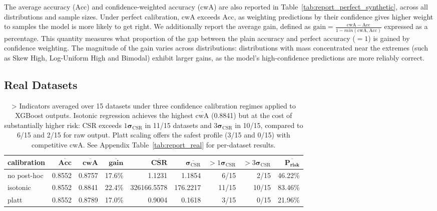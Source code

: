 \documentclass{article}
\theoremstyle{plain}
\theoremstyle{definition}
\theoremstyle{remark}
\begin{document}
The average accuracy ($\mathrm{Acc}$) and confidence-weighted accuracy ($\mathrm{cwA}$) are also reported in Table~\ref{tab:report_perfect_synthetic}, across all distributions and sample sizes. Under perfect calibration, $\mathrm{cwA}$ exceeds $\mathrm{Acc}$, as weighting predictions by their confidence gives higher weight to samples the model is more likely to get right. We additionally report the average gain, defined as $
\mathrm{gain} = \frac{\mathrm{cwA} - \mathrm{Acc}}{1 - min(\mathrm{cwA},  \mathrm{Acc})}$ expressed as a percentage. This quantity measures what proportion of the gap between the plain accuracy and perfect accuracy ($=1$) is gained by confidence weighting. The magnitude of the gain varies across distributions: distributions with mass concentrated near the extremes (such as Skew High, Log-Uniform High and Bimodal) exhibit larger gains, as the model's high-confidence predictions are more reliably correct. 

\subsection{Real Datasets}


\begin{table}[ht]
\centering
\footnotesize

\begin{tabular}{lrrrrrrrr}
\toprule
calibration & $\overline{\textbf{Acc}}$ & $\overline{\textbf{cwA}}$ & $\overline{\textbf{gain}}$ & $\overline{\textbf{CSR}}$ & $\overline{\boldsymbol{\sigma}_{\mathrm{CSR}}}$ & $>1\boldsymbol{\sigma}_{\mathrm{CSR}}$ & $>3\boldsymbol{\sigma}_{\mathrm{CSR}}$ & $\overline{\textbf{P}_{\textbf{risk}}}$ \\
\midrule
no post-hoc & 0.8552 & 0.8757 & 17.6\% & 1.1231 & 1.1854 & 6/15 & 2/15 & 46.22\% \\
isotonic & 0.8552 & 0.8841 & 22.4\% & 326166.5578 & 176.2217 & 11/15 & 10/15 & 83.46\% \\
platt & 0.8552 & 0.8789 & 17.0\% & 0.9004 & 0.1618 & 3/15 & 0/15 & 21.96\% \\
\bottomrule
\end{tabular}
\caption{> Indicators averaged over 15 datasets under three confidence calibration regimes applied to XGBoost outputs. Isotonic regression achieves the highest $\overline{\text{cwA}}$ (0.8841) but at the cost of substantially higher risk: CSR exceeds $1\boldsymbol{\sigma}_{\mathrm{CSR}}$ in 11/15 datasets and $3\boldsymbol{\sigma}_{\mathrm{CSR}}$ in 10/15, compared to 6/15 and 2/15 for raw output. Platt scaling offers the safest profile (3/15 and 0/15) with competitive cwA. See Appendix Table~\ref{tab:report_real} for per-dataset results.}
\label{tab:report_real_datasets_averaged}
\end{table}
\end{document}

